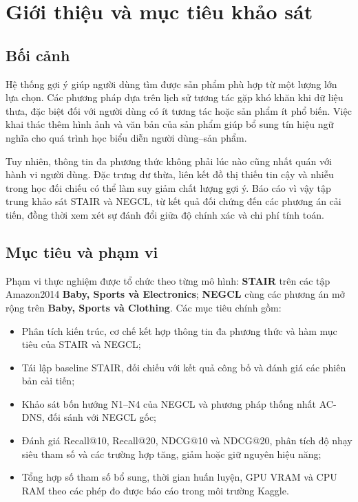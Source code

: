 \section{Giới thiệu và mục tiêu khảo sát}

\subsection{Bối cảnh}

Hệ thống gợi ý giúp người dùng tìm được sản phẩm phù hợp từ một lượng lớn lựa chọn. Các phương pháp dựa trên lịch sử tương tác gặp khó khăn khi dữ liệu thưa, đặc biệt đối với người dùng có ít tương tác hoặc sản phẩm ít phổ biến. Việc khai thác thêm hình ảnh và văn bản của sản phẩm giúp bổ sung tín hiệu ngữ nghĩa cho quá trình học biểu diễn người dùng--sản phẩm.

Tuy nhiên, thông tin đa phương thức không phải lúc nào cũng nhất quán với hành vi người dùng. Đặc trưng dư thừa, liên kết đồ thị thiếu tin cậy và nhiễu trong học đối chiếu có thể làm suy giảm chất lượng gợi ý. Báo cáo vì vậy tập trung khảo sát STAIR và NEGCL, từ kết quả đối chứng đến các phương án cải tiến, đồng thời xem xét sự đánh đổi giữa độ chính xác và chi phí tính toán.

\subsection{Mục tiêu và phạm vi}

Phạm vi thực nghiệm được tổ chức theo từng mô hình: \textbf{STAIR} trên các tập Amazon2014 \textbf{Baby, Sports và Electronics}; \textbf{NEGCL} cùng các phương án mở rộng trên \textbf{Baby, Sports và Clothing}. Các mục tiêu chính gồm:

\begin{itemize}[leftmargin=*,labelsep=6pt]
    \item Phân tích kiến trúc, cơ chế kết hợp thông tin đa phương thức và hàm mục tiêu của STAIR và NEGCL;
    \item Tái lập baseline STAIR, đối chiếu với kết quả công bố và đánh giá các phiên bản cải tiến;
    \item Khảo sát bốn hướng N1--N4 của NEGCL và phương pháp thống nhất AC-DNS, đối sánh với NEGCL gốc;
    \item Đánh giá Recall@10, Recall@20, NDCG@10 và NDCG@20, phân tích độ nhạy siêu tham số và các trường hợp tăng, giảm hoặc giữ nguyên hiệu năng;
    \item Tổng hợp số tham số bổ sung, thời gian huấn luyện, GPU VRAM và CPU RAM theo các phép đo được báo cáo trong môi trường Kaggle.
\end{itemize}


